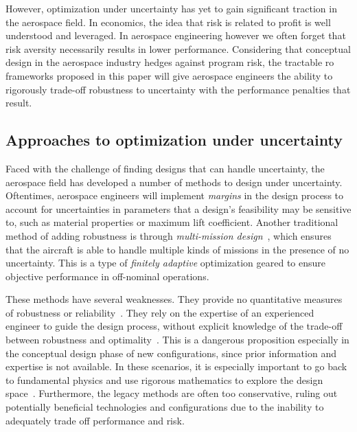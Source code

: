 However, optimization under uncertainty has yet to gain significant traction in the aerospace field.
In economics, the idea that risk is related to profit is well understood and leveraged.
In aerospace engineering however we often forget that risk aversity necessarily results in lower performance.
Considering that conceptual design in the aerospace industry hedges against program risk,
the tractable \gls{ro} frameworks proposed in this paper will
give aerospace engineers the ability to rigorously trade-off robustness to uncertainty with the performance penalties
that result.

\subsection{Approaches to optimization under uncertainty}
\label{sec:approaches}

Faced with the challenge of finding designs that can handle uncertainty,
the aerospace field has developed a number of methods to
design under uncertainty. Oftentimes, aerospace engineers will implement
\emph{margins} in the design process to account for uncertainties in parameters that a design's feasibility
may be sensitive to, such as material properties or maximum lift coefficient.
Another traditional method of adding robustness is through \emph{multi-mission design}~\cite{York2018},
which ensures that the aircraft is able to handle
multiple kinds of missions in the presence of no uncertainty. This is a type of \emph{finitely
adaptive} optimization geared to ensure objective performance in off-nominal operations.

These methods have several weaknesses. They provide no quantitative measures of
robustness or reliability~\cite{Zang2002}. They rely on the expertise of an experienced
engineer to guide the design process, without explicit knowledge of the trade-off between
robustness and optimality~\cite{Yao2011}. This is a dangerous proposition especially in the
conceptual design phase of new configurations, since prior information and expertise is not
available. In these scenarios, it is especially important to go back to fundamental physics
and use rigorous mathematics to explore the design space~\cite{York2018}. Furthermore,
the legacy methods are often too conservative, ruling out potentially beneficial technologies
and configurations due to the inability to adequately trade off performance and risk.

